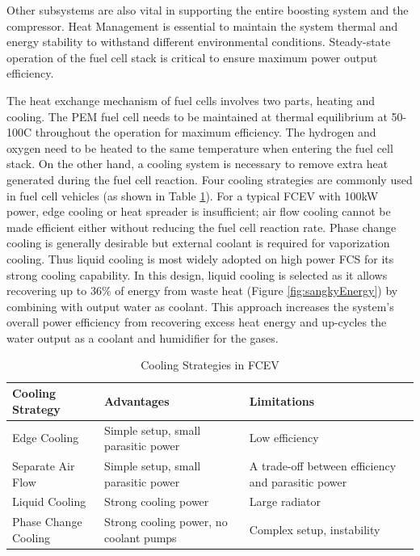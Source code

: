 \documentclass[a4paper,11pt]{article}
\begin{document}
Other subsystems are also vital in supporting the entire boosting system and the compressor. Heat Management is essential to maintain the system thermal and energy stability to withstand different environmental conditions. Steady-state operation of the fuel cell stack is critical to ensure maximum power output efficiency.  

The heat exchange mechanism of fuel cells involves two parts, heating and cooling. The PEM fuel cell needs to be maintained at thermal equilibrium at 50-100\degree C throughout the operation for maximum efficiency. The hydrogen and oxygen need to be heated to the same temperature when entering the fuel cell stack. On the other hand, a cooling system is necessary to remove extra heat generated during the fuel cell reaction. Four cooling strategies are commonly used in fuel cell vehicles (as shown in Table \ref{tab:coolingStrats}). For a typical FCEV with 100kW power, edge cooling or heat spreader is insufficient; air flow cooling cannot be made efficient either without reducing the fuel cell reaction rate\cite{wenthermalmanagement}. Phase change cooling is generally desirable but external coolant is required for vaporization cooling. Thus liquid cooling is most widely adopted on high power FCS for its strong cooling capability\cite{nguyen2020proton}.  In this design, liquid cooling is selected as it allows recovering up to 36\% of energy from waste heat (Figure \ref{fig:sangkyEnergy}) by combining with output water as coolant. This approach increases the system's overall power efficiency from recovering excess heat energy and up-cycles the water output as a coolant and humidifier for the gases. 

\begin{table}[h!]
    \centering
    \begin{tabular}{|p{}|p{}||p{}|} %
    \hline
    Cooling Strategy & Advantages & Limitations \\ [0.5ex] 
    \hline\hline
    Edge Cooling & Simple setup, small parasitic power & Low efficiency \\
    \hline
    Separate Air Flow & Simple setup, small parasitic power & A trade-off between efficiency and parasitic power \\
    \hline
    Liquid Cooling & Strong cooling power & Large radiator \\
    \hline
    Phase Change Cooling & Strong cooling power, no coolant pumps & Complex setup, instability \\
    \hline
    \end{tabular}
    \caption{Cooling Strategies in FCEV}
    \label{tab:coolingStrats}
\end{table}
\end{document}
